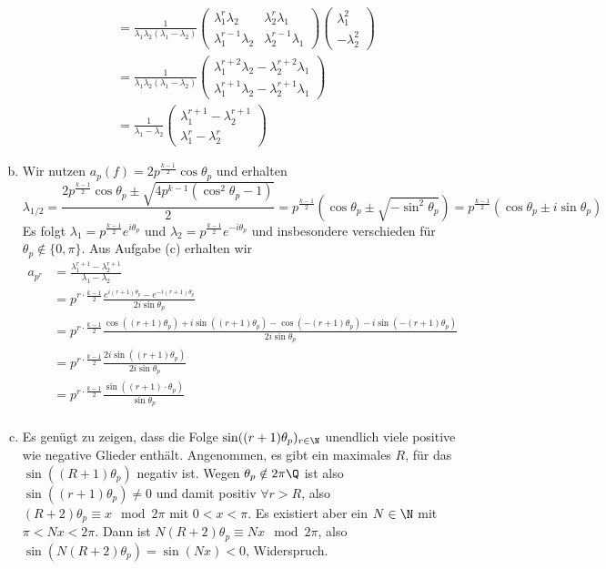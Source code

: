 \documentclass{article}
\begin{document}
\begin{enumerate}[(a)]
\begin{align*}
        &= \frac{1}{\lambda_1\lambda_2(\lambda_1-\lambda_2)}\begin{pmatrix}
            \lambda_1^{r}\lambda_2 &\lambda_2^{r}\lambda_1\\
            \lambda_1^{r-1}\lambda_2 & \lambda_2^{r-1}\lambda_1
        \end{pmatrix}\begin{pmatrix}
            \lambda_1^2\\
            - \lambda_2^2
        \end{pmatrix}\\
        &= \frac{1}{\lambda_1\lambda_2(\lambda_1-\lambda_2)}\begin{pmatrix}
            \lambda_1^{r+2}\lambda_2 - \lambda_2^{r+2}\lambda_1\\
            \lambda_1^{r+1}\lambda_2 - \lambda_2^{r+1}\lambda_1
        \end{pmatrix}\\
        &= \frac{1}{\lambda_1 - \lambda_2}\begin{pmatrix}
            \lambda_1^{r+1} - \lambda_2^{r+1}\\
            \lambda_1^{r} - \lambda_2^{r}
        \end{pmatrix}
    \end{align*}
    \item Wir nutzen $a_p(f) = 2p^\frac{k-1}{2}\cos \theta_p$ und erhalten 
    \[
        \lambda_{1/2} = \frac{2p^\frac{k-1}{2}\cos \theta_p \pm \sqrt{4p^{k-1} (\cos^2\theta_p - 1)}}{2} = p^\frac{k-1}{2} (\cos \theta_p \pm \sqrt{- \sin^2 \theta_p}) = p^\frac{k-1}{2}(\cos \theta_p \pm i \sin \theta_p)
    \]
    Es folgt $\lambda_1 = p^\frac{k-1}{2}e^{i\theta_p}$ und $\lambda_2 = p^\frac{k-1}{2}e^{-i\theta_p}$ und insbesondere verschieden für $\theta_p \notin \{0, \pi\}$.
    Aus Aufgabe (c) erhalten wir
    \begin{align*}
        a_{p^r} &= \frac{\lambda_1^{r+1} - \lambda_2^{r+1}}{\lambda_1 - \lambda_2}\\
        &= p^{r \cdot \frac{k-1}{2}}\frac{e^{i(r+1)\theta_p} - e^{-i(r+1)\theta_p}}{2i\sin \theta_p}\\
        &= p^{r \cdot \frac{k-1}{2}}\frac{\cos((r+1)\theta_p) + i\sin((r+1)\theta_p) - \cos(-(r+1)\theta_p) -i \sin(-(r+1)\theta_p)}{2i\sin \theta_p}\\
        &= p^{r \cdot \frac{k-1}{2}}\frac{2i\sin((r+1)\theta_p)}{2i\sin \theta_p}\\
        &= p^{r \cdot \frac{k-1}{2}}\frac{\sin((r+1)\cdot\theta_p)}{\sin \theta_p}\\
    \end{align*}
    \item Es genügt zu zeigen, dass die Folge $\sin((r+1)\theta_p)_{r\in \N}$ unendlich viele positive wie negative Glieder enthält.
    Angenommen, es gibt ein maximales $R$, für das $\sin((R+1)\theta_p)$ negativ ist. Wegen $\theta_p \notin 2\pi\Q$ ist also $\sin((r+1)\theta_p) \neq 0$ und damit positiv $\forall r > R$, also $(R + 2) \theta_p \equiv x \mod 2\pi$ mit $0 < x < \pi$.
    Es existiert aber ein $N \in \N$ mit $\pi< Nx < 2\pi$. Dann ist 
    $N (R + 2)\theta_p \equiv Nx \mod 2\pi$, also $\sin(N(R+2)\theta_p) = \sin(Nx) < 0$, Widerspruch.
\end{enumerate}
\end{document}
